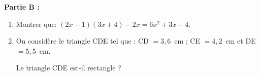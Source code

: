 \documentclass[exercice,a4]{thedocument}%
\begin{document}
\medskip

\textbf{Partie B :}

\medskip

\begin{enumerate}
\item Montrer que: $(2x - 1)(3x + 4) - 2x = 6x^2 + 3x - 4$.
\item On considère le triangle CDE tel que : CD $= 3,6$~cm ; CE $= 4,2$~cm et DE $= 5,5$~cm.

Le triangle CDE est-il rectangle ?
\end{enumerate}

\medskip

\showthesource
\end{document}
